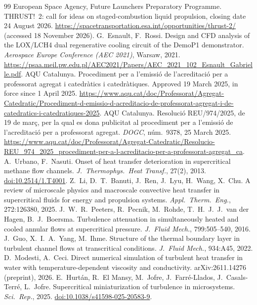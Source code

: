 \documentclass[11pt]{article}
\begin{document}
\begin{thebibliography}{99}
 European Space Agency, Future Launchers Preparatory Programme. THRUST!~2: call for ideas on staged-combustion liquid propulsion, closing date 24 August 2026. \url{https://spacetransportation.esa.int/opportunities/thrust-2/} (accessed 18 November 2026).
 G.\ Esnault, F.\ Rossi. Design and CFD analysis of the LOX/LCH4 dual regenerative cooling circuit of the DemoP1 demonstrator. \emph{Aerospace Europe Conference (AEC 2021)}, Warsaw, 2021. \url{https://psaa.meil.pw.edu.pl/AEC2021/Papers/AEC_2021_102_Esnault_Gabrielle.pdf}.
 AQU Catalunya. Procediment per a l'emissi\'o de l'acreditaci\'o per a professorat agregat i catedr\`atics i catedr\`atiques. Approved 19 March 2025, in force since 1 April 2025. {\def\UrlBreaks{\do\/\do\-}\url{https://www.aqu.cat/doc/Professorat/Agregat-Catedratic/Procediment-d-emissio-d-acreditacio-de-professorat-agregat-i-de-catedratics-i-catedratiques-2025}}.
 AQU Catalunya. Resoluci\'o REU/974/2025, de 19 de mar\c{c}, per la qual es dona publicitat al procediment per a l'emissi\'o de l'acreditaci\'o per a professorat agregat. \emph{DOGC}, n\'um.~9378, 25 March 2025. \url{https://www.aqu.cat/doc/Professorat/Agregat-Catedratic/Resolucio-REU_974_2025_procediment-per-a-l-acreditacio-per-a-professorat-agregat_ca}.
 A.\ Urbano, F.\ Nasuti. Onset of heat transfer deterioration in supercritical methane flow channels. \emph{J.\ Thermophys.\ Heat Transf.}, 27(2), 2013. \href{https://doi.org/10.2514/1.T4001}{doi:10.2514/1.T4001}.
 Z.\ Li, D.\ T.\ Banuti, J.\ Ren, J.\ Lyu, H.\ Wang, X.\ Chu. A review of microscale physics and macroscale convective heat transfer in supercritical fluids for energy and propulsion systems. \emph{Appl.\ Therm.\ Eng.}, 272:126380, 2025.
 J.\ W.\ R.\ Peeters, R.\ Pecnik, M.\ Rohde, T.\ H.\ J.\ J.\ van der Hagen, B.\ J.\ Boersma. Turbulence attenuation in simultaneously heated and cooled annular flows at supercritical pressure. \emph{J.\ Fluid Mech.}, 799:505--540, 2016.
 J.\ Guo, X.\ I.\ A.\ Yang, M.\ Ihme. Structure of the thermal boundary layer in turbulent channel flows at transcritical conditions. \emph{J.\ Fluid Mech.}, 934:A45, 2022.
 D.\ Modesti, A.\ Ceci. Direct numerical simulation of turbulent heat transfer in water with temperature-dependent viscosity and conductivity. arXiv:2611.14276 (preprint), 2026.
 E.\ Hurt\'an, R.\ El Mansy, M.\ Jofre, J.\ Farr\'e-Llados, J.\ Casals-Terr\'e, L.\ Jofre. Supercritical miniaturization of turbulence in microsystems. \emph{Sci.\ Rep.}, 2025. \href{https://doi.org/10.1038/s41598-025-20583-9}{doi:10.1038/s41598-025-20583-9}.

\end{thebibliography}
\end{document}
